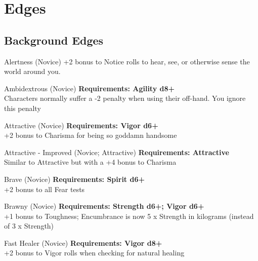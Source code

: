 
\section{Edges}

\begin{multicols}{2}

%
%
\subsection{Background Edges}

\begin{genericsection}{Alertness (Novice)}
+2 bonus to Notice rolls to hear, see, or otherwise sense the world around you.
\end{genericsection}

\begin{genericsection}{Ambidextrous (Novice)}
\textbf{Requirements: Agility d8+}\\
Characters normally suffer a -2 penalty when using their off-hand. You ignore this penalty
\end{genericsection}

\begin{genericsection}{Attractive (Novice)}
\textbf{Requirements: Vigor d6+}\\
+2 bonus to Charisma for being so goddamn handsome
\end{genericsection}

\begin{genericsection}{Attractive - Improved (Novice; Attractive)}
\textbf{Requirements: Attractive}\\
Similar to Attractive but with a +4 bonus to Charisma
\end{genericsection}

\begin{genericsection}{Brave (Novice)}
\textbf{Requirements: Spirit d6+}\\
+2 bonus to all Fear tests
\end{genericsection}

\begin{genericsection}{Brawny (Novice)}
\textbf{Requirements: Strength d6+; Vigor d6+}\\
+1 bonus to Toughness; Encumbrance is now 5 x Strength in kilograms (instead of 3 x Strength)
\end{genericsection}

\begin{genericsection}{Fast Healer (Novice)}
\textbf{Requirements: Vigor d8+}\\
+2 bonus to Vigor rolls when checking for natural healing
\end{genericsection}


\end{multicols}
